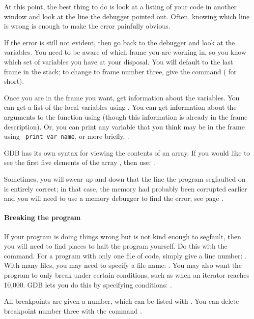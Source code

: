 \documentclass[12pt]{article}
\begin{document}
At this point, the best thing to do is look at a listing of your code
in another window and look at the line the debugger pointed out. Often,
knowing which line is wrong is enough to make the error painfully obvious.


If the error is still not evident, then go back to the debugger and look
at the variables. You need to be aware of which frame you are working in,
so you know which set of variables you have at your disposal.  You
will default to the last frame in the stack; to change to frame number
three, give the command  ( for short).

Once you are in the frame you want, get information about the variables. You can
get a list of the local variables using . You can get
information about the arguments to the function using 
(though this information is already in the frame description). Or, you
can print any variable that you think may be in the frame using {\tt
print var\_name}, or more briefly, . 

GDB has its own syntax for viewing the contents of an array. If you
would
like to see the first five elements of the array , then use:
.

Sometimes, you will swear up and down that the line the program segfaulted on is
entirely correct; in that case, the memory had probably been corrupted
earlier and you will need to use a memory debugger to find the error;
see page \pageref{valgrind}.

\paragraph{Breaking the program} If your program is doing things wrong but is not kind
enough to segfault, then you will need to find places to halt the program
yourself. Do this with the  command. For a program with only
one file of code, simply give a line number: . With many
files, you may need to specify a file name: . You
may also want the program to only break under certain conditions, such
as when an iterator reaches 10,000. GDB lets you do this by specifying
conditions: .

All breakpoints are given a number, which can be listed with
. You can delete breakpoint number three with
the command .
\end{document}
